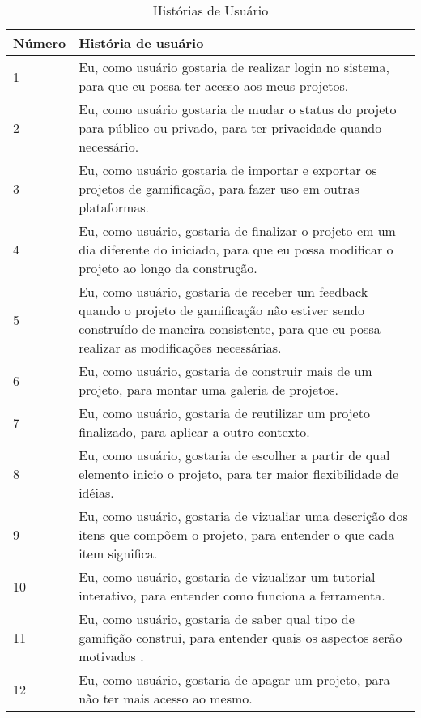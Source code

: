\begin{table}[!htpb]
\label{tab01}
\centering
\begin{tabular}{|p{1.5cm}|p{12cm}|} \hline

 Número & História de usuário \\ \hline

 1 & Eu, como usuário gostaria de realizar login no sistema, para que eu possa ter acesso aos meus projetos. \\ \hline

 2 & Eu, como usuário gostaria de mudar o status do projeto para público ou privado,  para ter privacidade quando necessário. \\ \hline

 3 & Eu, como usuário gostaria de importar e exportar os projetos de gamificação, para fazer uso em outras plataformas. \\ \hline

 4 & Eu, como usuário, gostaria de finalizar o projeto em um dia diferente do iniciado, para que eu possa modificar o projeto ao longo da construção. \\ \hline

 5 & Eu, como usuário, gostaria de receber um feedback quando o projeto de gamificação não estiver sendo construído de maneira consistente, para que eu possa realizar as modificações necessárias. \\ \hline

 6 & Eu, como usuário, gostaria de construir mais de um projeto, para montar uma galeria de projetos. \\ \hline

 7 & Eu, como usuário, gostaria de reutilizar um projeto finalizado, para aplicar a outro contexto. \\ \hline

 8 & Eu, como usuário, gostaria de escolher a partir de qual elemento inicio o projeto, para ter maior flexibilidade de idéias. \\ \hline

 9 & Eu, como usuário, gostaria de vizualiar uma descrição dos itens que compõem o projeto, para entender o que cada item significa. \\ \hline

 10 & Eu, como usuário, gostaria de vizualizar um tutorial interativo, para entender como funciona a ferramenta. \\ \hline

 11 & Eu, como usuário, gostaria de saber qual tipo de gamifição construi, para entender quais os aspectos serão motivados . \\ \hline

 12 & Eu, como usuário, gostaria de apagar um projeto, para não ter mais acesso ao mesmo. \\ \hline
\end{tabular}
\caption{Histórias de Usuário}
\end{table} 


